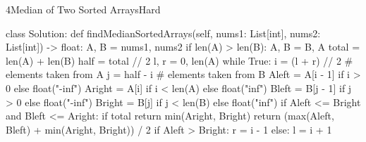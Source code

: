 \begin{problem}{4}{Median of Two Sorted Arrays}{Hard}
\begin{code}
class Solution:
    def findMedianSortedArrays(self, nums1: List[int], nums2: List[int]) -> float:
        A, B = nums1, nums2
        if len(A) > len(B):
            A, B = B, A
        total = len(A) + len(B)
        half = total // 2
        l, r = 0, len(A)
        while True:
            i = (l + r) // 2          # elements taken from A
            j = half - i              # elements taken from B
            Aleft = A[i - 1] if i > 0 else float("-inf")
            Aright = A[i] if i < len(A) else float("inf")
            Bleft = B[j - 1] if j > 0 else float("-inf")
            Bright = B[j] if j < len(B) else float("inf")
            if Aleft <= Bright and Bleft <= Aright:
                if total %
                    return min(Aright, Bright)
                return (max(Aleft, Bleft) + min(Aright, Bright)) / 2
            if Aleft > Bright:
                r = i - 1
            else:
                l = i + 1
\end{code}
\end{problem}
